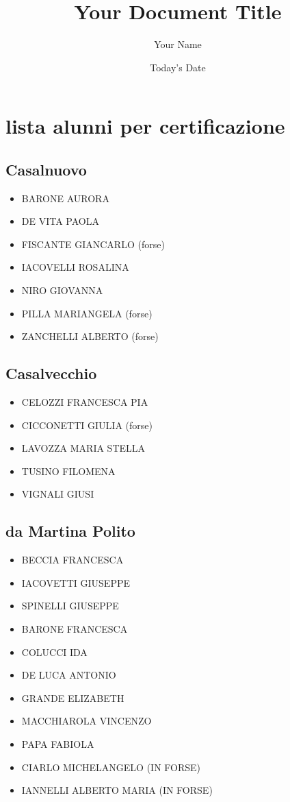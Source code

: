 \documentclass{article}
\title{Your Document Title}
\author{Your Name}
\date{Today's Date} %
\begin{document}
	
	\section*{lista alunni per certificazione} %
	
	\subsection*{Casalnuovo}
	\begin{itemize}
		
	
		\item	BARONE	AURORA
		\item	DE VITA	PAOLA
		\item	FISCANTE	GIANCARLO (forse)
		\item	IACOVELLI	ROSALINA
		\item	NIRO	GIOVANNA
		\item	PILLA	MARIANGELA (forse)
		\item	ZANCHELLI	ALBERTO (forse)
\end{itemize}

	\subsection*{Casalvecchio}
\begin{itemize}

	\item	CELOZZI	FRANCESCA PIA
	\item	CICCONETTI	GIULIA (forse)
	\item	LAVOZZA	MARIA STELLA
	\item	TUSINO	FILOMENA
	\item	VIGNALI	GIUSI
\end{itemize}
	

	\subsection*{da Martina Polito}
\begin{itemize}
	
	 
	
	\item	BECCIA FRANCESCA 
	\item	IACOVETTI GIUSEPPE 
	\item	SPINELLI GIUSEPPE 
	\item	BARONE FRANCESCA 
	\item	COLUCCI IDA 
	\item	DE LUCA ANTONIO 
	\item	GRANDE ELIZABETH 
	\item	MACCHIAROLA VINCENZO 
	\item	PAPA FABIOLA 
	\item	CIARLO MICHELANGELO (IN FORSE) 
	\item	IANNELLI ALBERTO MARIA (IN FORSE)
\end{itemize}
	
\end{document}
